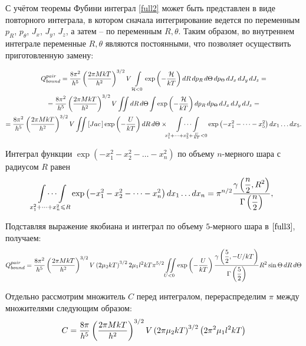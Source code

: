 \documentclass[12pt]{article}
\newcommand{\lb}{\left(}
\newcommand{\rb}{\right)}
\newcommand{\mH}{\mathcal{H}}
\newcommand{\intl}{\int\limits}
\begin{document}
С учётом теоремы Фубини интеграл \eqref{full2} может быть представлен в виде повторного интеграла, в котором сначала интегрирование ведется по переменным $p_R$, $p_\theta$, $J_x$, $J_y$, $J_z$, а затем  -- по переменным $R, \theta$. Таким образом, во внутреннем интеграле переменные $R, \theta$ являются постоянными, что позволяет осуществить приготовленную замену:

\begin{gather}
		Q_{bound}^{pair} = \frac{8 \pi^2}{h^5} \lb \frac{2 \pi M k T}{h^2} \rb^{3/2} V \intl_{\mH < 0} \exp \lb -\frac{\mH}{kT} \rb dR \, dp_R \, d \Theta \, dp_\Theta \, d J_x \, d J_y \, d J_z = \notag \\
		= \frac{8 \pi^2}{h^5} \lb \frac{2 \pi M k T}{h^2} \rb^{3/2} V \iint dR \, d \Theta \int \exp \lb -\frac{\mH}{kT} \rb d p_R \, d p_\Theta \, d J_x \, d J_y \, d J_z = \notag \\
		= \frac{8 \pi^2}{h^5} \lb \frac{2 \pi M k T}{h^2} \rb^{3/2} V \iint  \left[ Jac \, \right] \exp \lb -\frac{U}{kT} \rb d R \, d \Theta \times \idotsint\limits_{x_1^2 + \dots + x_5^2 + \frac{U}{kT} < 0} \exp \lb - x_1^2 - \dots - x_5^2 \rb dx_1 \dots dx_5. \label{full3}
\end{gather}

Интеграл функции $\exp \lb - x_1^2  - x_2^2 - \dots - x_n^2 \rb$ по объему $n$-мерного шара с радиусом $R$ равен 
\vverh
\begin{gather}
	\idotsint\limits_{x_1^2 + \dots + x_n^2 \leqslant R} \exp \lb -x_1^2 - x_2^2 - \dots - x_n^2 \rb d x_1 \dots d x_n = \pi^{n/2} \frac{\gamma \lb \displaystyle \frac{n}{2}, R^2 \rb}{\Gamma \lb \displaystyle \frac{n}{2} \rb}, \notag
\end{gather}

Подставляя выражение якобиана и интеграл по объему $5$-мерного шара в $\eqref{full3}$, получаем:
\begin{gather}
		Q_{bound}^{pair} = \frac{8 \pi^2}{h^5} \lb \frac{2 \pi M k T}{h^2} \rb^{3/2} V \lb 2 \mu_2 k T \rb^{3/2} 2 \mu_1 l^2 k T \pi^{5/2} \iint\limits_{U < 0} \exp \lb - \frac{U}{k T} \rb \frac{\gamma \lb \displaystyle \frac{5}{2}, -U/kT \rb}{\Gamma \lb \displaystyle \frac{5}{2} \rb} R^2 \sin \Theta \, d R \, d \Theta \notag
\end{gather}

Отдельно рассмотрим множитель $C$ перед интегралом, перераспределим $\pi$ между множителями следующим образом:
\begin{gather}
	C = \frac{8 \pi}{h^5} \lb \frac{2 \pi M k T}{h^2} \rb^{3/2} V \lb 2 \pi \mu_2 k T \rb^{3/2} \lb 2 \pi^2 \mu_1 l^2 k T \rb \notag
\end{gather}
\end{document}
